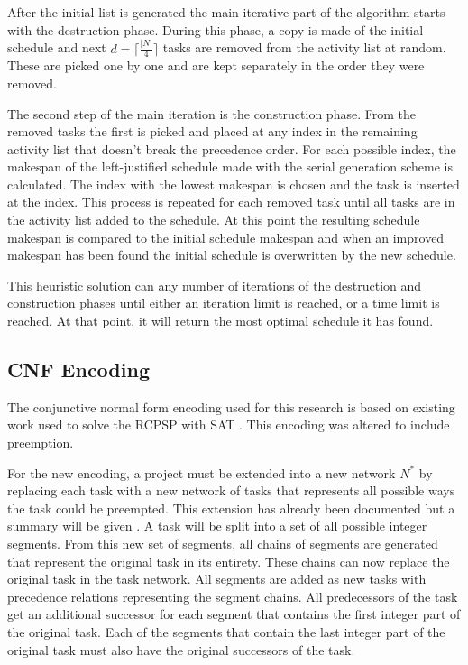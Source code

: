 After the initial list is generated the main iterative part of the algorithm starts with the destruction phase. During this phase, a copy is made of the initial schedule and next \(d=\lceil\frac{|N|}{4}\rceil\)  tasks are removed from the activity list at random. These are picked one by one and are kept separately in the order they were removed.

The second step of the main iteration is the construction phase. From the removed tasks the first is picked and placed at any index in the remaining activity list that doesn't break the precedence order. For each possible index, the makespan of the left-justified schedule made with the serial generation scheme is calculated. The index with the lowest makespan is chosen and the task is inserted at the index. This process is repeated for each removed task until all tasks are in the activity list added to the schedule. At this point the resulting schedule makespan is compared to the initial schedule makespan and when an improved makespan has been found the initial schedule is overwritten by the new schedule.

This heuristic solution can any number of iterations of the destruction and construction phases until either an iteration limit is reached, or a time limit is reached. At that point, it will return the most optimal schedule it has found.


\subsection{CNF Encoding}
The conjunctive normal form encoding used for this research is based on existing work used to solve the RCPSP with SAT \cite{RN17}. This encoding was altered to include preemption.

For the new encoding, a project must be extended into a new network \(N^*\) by replacing each task with a new network of tasks that represents all possible ways the task could be preempted. This extension has already been documented but a summary will be given \cite{RN1}. A task will be split into a set of all possible integer segments. From this new set of segments, all chains of segments are generated that represent the original task in its entirety. These chains can now replace the original task in the task network. All segments are added as new tasks with precedence relations representing the segment chains. All predecessors of the task get an additional successor for each segment that contains the first integer part of the original task. Each of the segments that contain the last integer part of the original task must also have the original successors of the task.

